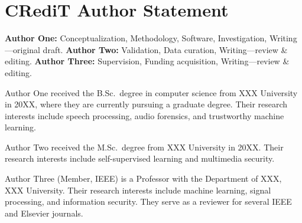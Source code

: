 \documentclass[journal]{IEEEtran}
\begin{document}
\section*{CRediT Author Statement}
\textbf{Author One:} Conceptualization, Methodology, Software, Investigation,
Writing---original draft. \textbf{Author Two:} Validation, Data curation,
Writing---review \& editing. \textbf{Author Three:} Supervision, Funding acquisition,
Writing---review \& editing.




\begin{IEEEbiographynophoto}{Author One}
received the B.Sc.\ degree in computer science from XXX University in 20XX, where they
are currently pursuing a graduate degree. Their research interests include speech
processing, audio forensics, and trustworthy machine learning.
\end{IEEEbiographynophoto}

\begin{IEEEbiographynophoto}{Author Two}
received the M.Sc.\ degree from XXX University in 20XX. Their research interests
include self-supervised learning and multimedia security.
\end{IEEEbiographynophoto}

\begin{IEEEbiographynophoto}{Author Three}
(Member, IEEE) is a Professor with the Department of XXX, XXX University. Their
research interests include machine learning, signal processing, and information
security. They serve as a reviewer for several IEEE and Elsevier journals.
\end{IEEEbiographynophoto}
\end{document}
